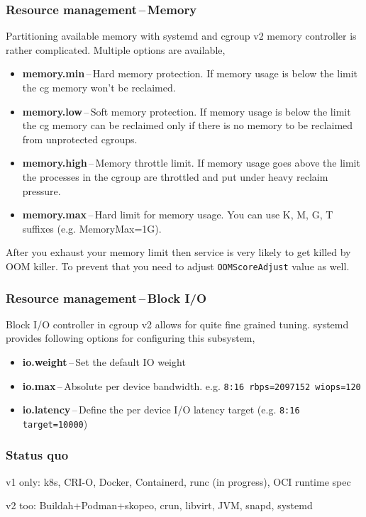 \documentclass[serif]{beamer}
\begin{document}
\begin{frame}
  \frametitle{Resource management\,--\,Memory}
  Partitioning available memory with systemd and cgroup v2 memory controller is rather complicated. Multiple options are available,
  \begin{itemize}
  \item \textbf{memory.min}\,--\,Hard memory protection. If memory usage is below the limit the cg memory won't be reclaimed.
  \item \textbf{memory.low}\,--\,Soft memory protection. If memory usage is below the limit the cg memory can be reclaimed only if there is no memory to be reclaimed from unprotected cgroups.
  \item \textbf{memory.high}\,--\,Memory throttle limit. If memory usage goes above the limit the processes in the cgroup are throttled and put under heavy reclaim pressure.
  \item \textbf{memory.max}\,--\,Hard limit for memory usage. You can use K, M, G, T suffixes (e.g. MemoryMax=1G).
  \end{itemize}

  After you exhaust your memory limit then service is very likely to
  get killed by OOM killer. To prevent that you need to adjust
  \texttt{OOMScoreAdjust} value as well.
\end{frame}

\begin{frame}
  \frametitle{Resource management\,--\,Block I/O}
  Block I/O controller in cgroup v2 allows for quite fine grained tuning. systemd provides following options for configuring this subsystem,
  \begin{itemize}
  \item \textbf{io.weight}\,--\,Set the default IO weight
  \item \textbf{io.max}\,--\,Absolute per device bandwidth. e.g. \texttt{8:16 rbps=2097152 wiops=120}
  \item \textbf{io.latency}\,--\,Define the per device I/O latency target (e.g. \texttt{8:16 target=10000})
  \end{itemize}
\end{frame}


\begin{frame}
  \frametitle{Status quo}

  v1 only: k8s, CRI-O, Docker, Containerd, runc (in progress), OCI runtime spec

  \medskip

  v2 too: Buildah+Podman+skopeo, crun, libvirt, JVM, snapd, systemd
\end{frame}
\end{document}
